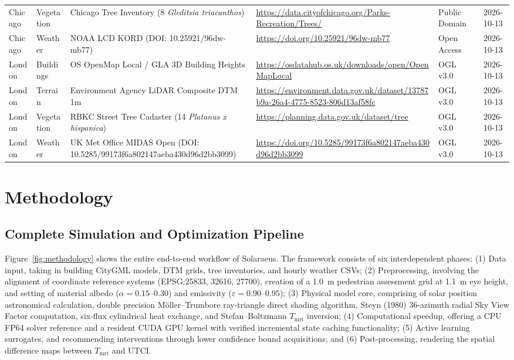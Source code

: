 \documentclass[conference]{IEEEtran}
\newcommand{\Tmrt}{T_{\mathrm{mrt}}}
\newcommand{\UTCI}{\mathrm{UTCI}}
\begin{document}
\begin{table}[!t]
\begin{tabularx}{\textwidth}{@{}l l p{4.0cm} Y p{1.6cm} c@{}}
Chicago & Vegetation & Chicago Tree Inventory (8 \textit{Gleditsia triacanthos}) & \url{https://data.cityofchicago.org/Parks-Recreation/Trees/} & Public Domain & 2026-10-13 \\
Chicago & Weather & NOAA LCD KORD (DOI: 10.25921/96dw-mb77) & \url{https://doi.org/10.25921/96dw-mb77} & Open Access & 2026-10-13 \\
London & Buildings & OS OpenMap Local / GLA 3D Building Heights & \url{https://osdatahub.os.uk/downloads/open/OpenMapLocal} & OGL v3.0 & 2026-10-13 \\
London & Terrain & Environment Agency LiDAR Composite DTM 1m & \url{https://environment.data.gov.uk/dataset/13787b9a-26a4-4775-8523-806d13af58fc} & OGL v3.0 & 2026-10-13 \\
London & Vegetation & RBKC Street Tree Cadaster (14 \textit{Platanus x hispanica}) & \url{https://planning.data.gov.uk/dataset/tree} & OGL v3.0 & 2026-10-13 \\
London & Weather & UK Met Office MIDAS Open (DOI: 10.5285/99173f6a802147aeba430d96d2bb3099) & \url{https://doi.org/10.5285/99173f6a802147aeba430d96d2bb3099} & OGL v3.0 & 2026-10-13 \\
\bottomrule
\end{tabularx}
\end{table}

\section{Methodology}

\subsection{Complete Simulation and Optimization Pipeline}
Figure~\ref{fig:methodology} shows the entire end-to-end workflow of Solaraeus. The framework consists of six interdependent phases: (1) Data input, taking in building CityGML models, DTM grids, tree inventories, and hourly weather CSVs; (2) Preprocessing, involving the alignment of coordinate reference systems (EPSG:25833, 32616, 27700), creation of a 1.0~m pedestrian assessment grid at 1.1~m eye height, and setting of material albedo ($\alpha = 0.15\text{--}0.30$) and emissivity ($\varepsilon = 0.90\text{--}0.95$); (3) Physical model core, comprising of solar position astronomical calculation, double precision M{\"o}ller--Trumbore ray-triangle direct shading algorithm, Steyn (1980) 36-azimuth radial Sky View Factor computation, six-flux cylindrical heat exchange, and Stefan--Boltzmann $\Tmrt$ inversion; (4) Computational speedup, offering a CPU FP64 solver reference and a resident CUDA GPU kernel with verified incremental state caching functionality; (5) Active learning surrogates, and recommending interventions through lower confidence bound acquisitions; and (6) Post-processing, rendering the spatial difference maps between $\Tmrt$ and $\UTCI$.
\end{document}
